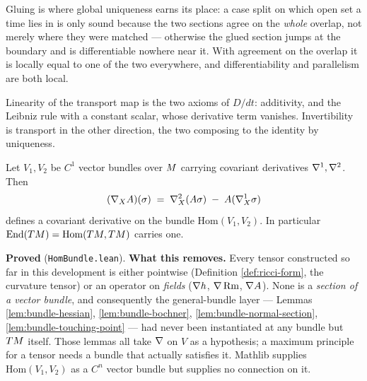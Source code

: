 \begin{lemma}
  Gluing is where global uniqueness earns its place: a case split on which open set a time
  lies in is only sound because the two sections agree on the \emph{whole} overlap, not merely
  where they were matched --- otherwise the glued section jumps at the boundary and is
  differentiable nowhere near it. With agreement on the overlap it is locally equal to one of
  the two everywhere, and differentiability and parallelism are both local.

  Linearity of the transport map is the two axioms of $D/dt$: additivity, and the Leibniz rule
  with a constant scalar, whose derivative term vanishes. Invertibility is transport in the
  other direction, the two composing to the identity by uniqueness.
\end{lemma}

\begin{lemma}
  \label{lem:hom-bundle-connection}
  \leanok
  Let $V_1, V_2$ be $C^1$ vector bundles over $M$ carrying covariant derivatives
  $\nabla^1, \nabla^2$. Then
  \[
    (\nabla_X A)(\sigma) \;=\; \nabla^2_X(A\sigma) \;-\; A(\nabla^1_X\sigma)
  \]
  defines a covariant derivative on the bundle $\mathrm{Hom}(V_1,V_2)$. In particular
  $\mathrm{End}(TM) = \mathrm{Hom}(TM,TM)$ carries one.

  \textbf{Proved} (\texttt{HomBundle.lean}). \textbf{What this removes.} Every tensor
  constructed so far in this development is either pointwise (Definition \ref{def:ricci-form},
  the curvature tensor) or an operator on \emph{fields} ($\nabla h$, $\nabla\operatorname{Rm}$,
  $\nabla A$). None is a \emph{section of a vector bundle}, and consequently the
  general-bundle layer --- Lemmas \ref{lem:bundle-hessian}, \ref{lem:bundle-bochner},
  \ref{lem:bundle-normal-section}, \ref{lem:bundle-touching-point} --- had never been
  instantiated at any bundle but $TM$ itself. Those lemmas all take
  $\nabla$ on $V$ as a hypothesis; a maximum principle for a tensor needs a bundle that
  actually satisfies it. Mathlib supplies $\mathrm{Hom}(V_1,V_2)$ as a $C^n$ vector bundle
  but supplies no connection on it.


\end{lemma}
